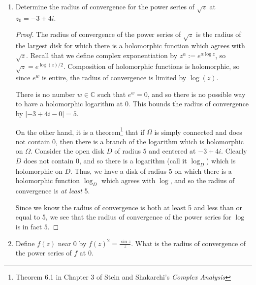 \documentclass{article}
\begin{document}
\begin{enumerate}
\begin{proof}
		We could also see that $1+x^2$ is an even function and $\sin(x)$ is an odd function so $\sin(x)/(1+x^2)$ is an odd function, 
		so its integral must be 0, but why do that when we could use the residue theorem \smiley{}.
	\end{proof}	
	
	\setcounter{enumi}{4}
	
	\item Determine the radius of convergence for the power series of $\sqrt{z}$ at $z_0 = -3 + 4i$.
	
	\begin{proof}
	The radius of convergence of the power series of $\sqrt{z}$ is the radius of the largest disk for which there is a holomorphic function which agrees with $\sqrt{z}$.
	Recall that we define complex exponentiation by $z^\alpha := e^{\alpha \log z}$, so $\sqrt{z} = e^{\log(z)/2}$. Composition of holomorphic functions is holomorphic, so since $e^w$ is entire, the radius of convergence is limited by $\log(z)$. 
	
	There is no number $w \in \mathbb{C}$ such that $e^w = 0$, and so there is no possible way to have a holomorphic logarithm at $0$. This bounds the radius of convergence by $|-3 + 4i - 0|=5$. 
	
	On the other hand, it is a theorem\footnote{Theorem 6.1 in Chapter 3 of Stein and Shakarchi's \textit{Complex Analysis}} that if $\Omega$ is simply connected and does not contain $0$, then there is a branch of the logarithm which is holomorphic on $\Omega$. Consider the open disk $D$ of radius $5$ and centered at $-3 + 4i$. Clearly $D$ does not contain $0$, and so there is a logarithm (call it $\log_D$) which is holomorphic on $D$. Thus, we have a disk of radius $5$ on which there is a holomorphic function $\log_D$ which agrees with $\log$, and so the radius of convergence is \textit{at least} 5. 
	
	Since we know the radius of convergence is both at least 5 and less than or equal to 5, we see that the radius of convergence of the power series for $\log$ is in fact $5$.
	
	\end{proof}
	
	\setcounter{enumi}{7}
	
	\item Define $f(z)$ near $0$ by $f(z)^2 = \frac{\sin z}{z}$. What is the radius of convergence of the power series of $f$ at $0$.
	

\end{enumerate}
\end{document}
